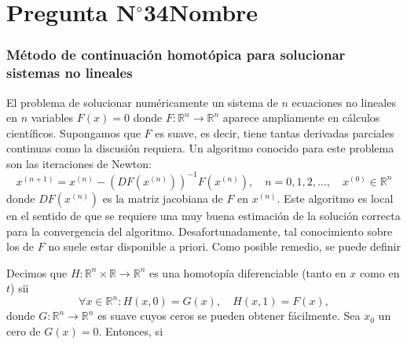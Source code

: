 \section{Pregunta N$^{\circ}$34\qquad Nombre}

\begin{frame}
	\frametitle{
		Método de continuación homotópica para solucionar sistemas no
		lineales
	}

	El problema de solucionar numéricamente un sistema de $n$
	ecuaciones no lineales en $n$ variables $F\left(x\right)=0$
	donde
	\begin{math}
		F\colon\mathbb{R}^{n}\to\mathbb{R}^{n}
	\end{math}
	aparece ampliamente en cálculos científicos.
	Supongamos que $F$ es suave, es decir, tiene tantas derivadas
	parciales continuas como la discusión requiera.
	Un algoritmo conocido para este problema son las
	\alert{iteraciones de Newton}:
	\begin{equation*}
		x^{\left(n+1\right)}=
		x^{\left(n\right)}-
		{\left(DF\left(x^{\left(n\right)}\right)\right)}^{-1}
		F\left(x^{\left(n\right)}\right),\quad
		n=0,1,2,\dotsc,\quad
		x^{\left(0\right)}\in\mathbb{R}^{n}
	\end{equation*}
	donde
	\begin{math}
		DF\left(x^{\left(n\right)}\right)
	\end{math}
	es la matriz jacobiana de $F$ en $x^{\left(n\right)}$.
	Este algoritmo es \alert{local} en el sentido de que se requiere
	una muy buena estimación de la solución correcta para la
	convergencia del algoritmo.
	Desafortunadamente, tal conocimiento sobre los de $F$ no suele
	estar disponible a priori.
	Como posible remedio, se puede definir

	\begin{definition}
		Decimos que
		\begin{math}
			H\colon
			\mathbb{R}^{n}\times\mathbb{R}\to
			\mathbb{R}^{n}
		\end{math}
		es una \alert{homotopía diferenciable} (tanto en $x$ como en $t$)
		sii
		\begin{equation*}
			\forall x\in\mathbb{R}^{n}:
			H\left(x,0\right)=
			G\left(x\right),\quad
			H\left(x,1\right)=
			F\left(x\right),
		\end{equation*}
		donde
		\begin{math}
			G\colon\mathbb{R}^{n}\to\mathbb{R}^{n}
		\end{math}
		es suave cuyos ceros se pueden obtener fácilmente.
		Sea $x_{0}$ un cero de $G\left(x\right)=0$.
		Entonces, si
	\end{definition}


\end{frame}
